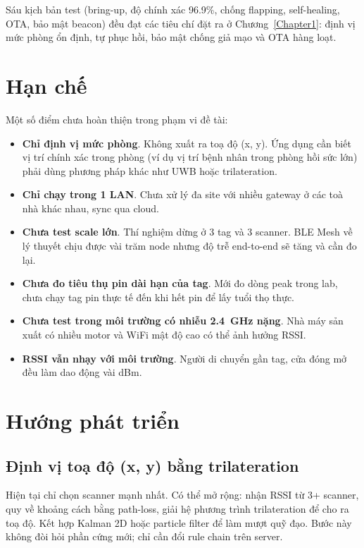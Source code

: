 Sáu kịch bản test (bring-up, độ chính xác 96.9\%, chống flapping, self-healing, OTA, bảo mật beacon) đều đạt các tiêu chí đặt ra ở Chương~\ref{Chapter1}: định vị mức phòng ổn định, tự phục hồi, bảo mật chống giả mạo và OTA hàng loạt.

\section{Hạn chế}

Một số điểm chưa hoàn thiện trong phạm vi đề tài:

\begin{itemize}
    \item \textbf{Chỉ định vị mức phòng}. Không xuất ra toạ độ (x, y). Ứng dụng cần biết vị trí chính xác trong phòng (ví dụ vị trí bệnh nhân trong phòng hồi sức lớn) phải dùng phương pháp khác như UWB hoặc trilateration.
    \item \textbf{Chỉ chạy trong 1 LAN}. Chưa xử lý đa site với nhiều gateway ở các toà nhà khác nhau, sync qua cloud.
    \item \textbf{Chưa test scale lớn}. Thí nghiệm dừng ở 3 tag và 3 scanner. BLE Mesh về lý thuyết chịu được vài trăm node nhưng độ trễ end-to-end sẽ tăng và cần đo lại.
    \item \textbf{Chưa đo tiêu thụ pin dài hạn của tag}. Mới đo dòng peak trong lab, chưa chạy tag pin thực tế đến khi hết pin để lấy tuổi thọ thực.
    \item \textbf{Chưa test trong môi trường có nhiễu 2.4~GHz nặng}. Nhà máy sản xuất có nhiều motor và WiFi mật độ cao có thể ảnh hưởng RSSI.
    \item \textbf{RSSI vẫn nhạy với môi trường}. Người di chuyển gần tag, cửa đóng mở đều làm dao động vài dBm.
\end{itemize}

\section{Hướng phát triển}

\subsection{Định vị toạ độ (x, y) bằng trilateration}

Hiện tại chỉ chọn scanner mạnh nhất. Có thể mở rộng: nhận RSSI từ 3+ scanner, quy về khoảng cách bằng path-loss, giải hệ phương trình trilateration để cho ra toạ độ. Kết hợp Kalman 2D hoặc particle filter để làm mượt quỹ đạo. Bước này không đòi hỏi phần cứng mới; chỉ cần đổi rule chain trên server.

